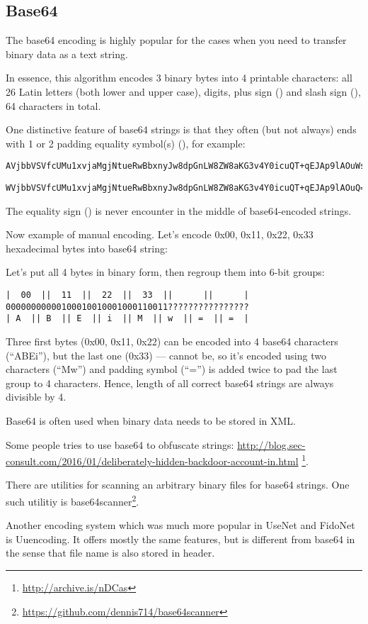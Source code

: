 \subsection{Base64}

The base64 encoding is highly popular for the cases when you need to transfer binary data as a text string.

In essence, this algorithm encodes 3 binary bytes into 4 printable characters:
all 26 Latin letters (both lower and upper case), digits, plus sign (\q{+}) and slash sign (\q{/}),
64 characters in total.

One distinctive feature of base64 strings is that they often (but not always) ends with 1 or 2 \gls{padding}
equality symbol(s) (\q{=}), for example:

\begin{lstlisting}
AVjbbVSVfcUMu1xvjaMgjNtueRwBbxnyJw8dpGnLW8ZW8aKG3v4Y0icuQT+qEJAp9lAOuWs=
\end{lstlisting}

\begin{lstlisting}
WVjbbVSVfcUMu1xvjaMgjNtueRwBbxnyJw8dpGnLW8ZW8aKG3v4Y0icuQT+qEJAp9lAOuQ==
\end{lstlisting}

The equality sign (\q{=}) is never encounter in the middle of base64-encoded strings.

Now example of manual encoding.
Let's encode 0x00, 0x11, 0x22, 0x33 hexadecimal bytes into base64 string:



Let's put all 4 bytes in binary form, then regroup them into 6-bit groups:

\begin{lstlisting}
|  00  ||  11  ||  22  ||  33  ||      ||      |
00000000000100010010001000110011????????????????
| A  || B  || E  || i  || M  || w  || =  || =  |
\end{lstlisting}

Three first bytes (0x00, 0x11, 0x22) can be encoded into 4 base64 characters (``ABEi''),
but the last one (0x33) --- cannot be,
so it's encoded using two characters (``Mw'') and \gls{padding} symbol (``='')
is added twice to pad the last group to 4 characters.
Hence, length of all correct base64 strings are always divisible by 4.

Base64 is often used when binary data needs to be stored in XML.

Some people tries to use base64 to obfuscate strings:
\url{http://blog.sec-consult.com/2016/01/deliberately-hidden-backdoor-account-in.html}
\footnote{\url{http://archive.is/nDCas}}.

There are utilities for scanning an arbitrary binary files for base64 strings.
One such utilitiy is base64scanner\footnote{\url{https://github.com/dennis714/base64scanner}}.

Another encoding system which was much more popular in UseNet and FidoNet is Uuencoding.
It offers mostly the same features, but is different from base64 in the sense that file name
is also stored in header.
